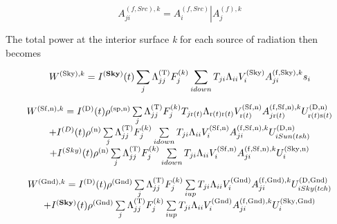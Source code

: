 \begin{equation}
A_{ji}^{\left( {f,Src} \right),k} = \left. {A_i^{\left( {f,Src} \right)}} \right|A_j^{\left( f \right),k}
\end{equation}

The total power at the interior surface \emph{k} for each source of radiation then becomes

\begin{equation}
{W^{{\rm{(Sky), }}k}} = {I^{({\bf{Sky}})}}(t)\sum\limits_j {\Lambda_{jj}^{{\rm{(T)}}}F_j^{{\rm{(}}k{\rm{)}}}\sum\limits_{i{\rm{ }}down} {{T_{ji}}{\Lambda_{ii}}V_i^{{\rm{(Sky)}}}A_{ji}^{{\rm{(f, Sky), }}k}{s_i}} }
\end{equation}

\begin{equation}
\begin{array}{c}{W^{{\rm{(Sf,n)}},k}} = {I^{{\rm{(D)}}}}(t){\rho ^{{\rm{(sp, n)}}}}\sum\limits_j {\Lambda_{jj}^{{\rm{(T)}}}F_j^{{\rm{(}}k{\rm{)}}}{T_{j{\rm{ r(}}t{\rm{)}}}}{\Lambda_{{\rm{ r(}}t{\rm{) r(}}t{\rm{)}}}}V_{{\rm{ r(}}t{\rm{)}}}^{{\rm{(Sf, n)}}}A_{j{\rm{ r(}}t{\rm{)}}}^{{\rm{(f, Sf, n), }}k}U_{{\rm{ r(}}t{\rm{) s(}}t{\rm{)}}}^{{\rm{(D,n)}}}} \\ + {I^{(D)}}(t){\rho ^{{\rm{(n)}}}}\sum\limits_j {\Lambda_{jj}^{{\rm{(T)}}}F_j^{{\rm{(}}k{\rm{)}}}\sum\limits_{i{\rm{ }}down} {{T_{ji}}{\Lambda_{ii}}V_i^{{\rm{(Sf, n)}}}A_{ji}^{{\rm{(f, Sf, n), }}k}U_{i{\rm{ }}Sun(tsh)}^{{\rm{(D,n)}}}} } \\ + {I^{(Sky)}}(t){\rho ^{{\rm{(n)}}}}\sum\limits_j {\Lambda_{jj}^{{\rm{(T)}}}F_j^{{\rm{(}}k{\rm{)}}}\sum\limits_{i{\rm{ }}down} {{T_{ji}}{\Lambda_{ii}}V_i^{{\rm{(Sf, n)}}}A_{ji}^{{\rm{(f, Sf, n), }}k}U_i^{{\rm{(Sky,n)}}}} } \end{array}
\end{equation}

\begin{equation}
\begin{array}{c}{W^{{\rm{(Gnd)}},k}} = {I^{{\rm{(D)}}}}(t){\rho ^{{\rm{(Gnd)}}}}\sum\limits_j {\Lambda_{jj}^{{\rm{(T)}}}F_j^{{\rm{(}}k{\rm{)}}}\sum\limits_{i{\rm{ }}up} {{T_{ji}}{\Lambda_{ii}}V_i^{{\rm{(Gnd)}}}A_{ji}^{{\rm{(f, Gnd), }}k}U_{i{\rm{ }}Sky(tch)}^{{\rm{(D, Gnd)}}}} } \\ + {I^{({\bf{Sky}})}}(t){\rho ^{{\rm{(Gnd)}}}}\sum\limits_j {\Lambda_{jj}^{{\rm{(T)}}}F_j^{{\rm{(}}k{\rm{)}}}\sum\limits_{i{\rm{ }}up} {{T_{ji}}{\Lambda_{ii}}V_i^{{\rm{(Gnd)}}}A_{ji}^{{\rm{(f, Gnd), }}k}U_i^{{\rm{( Sky,Gnd)}}}} } \end{array}
\end{equation}

